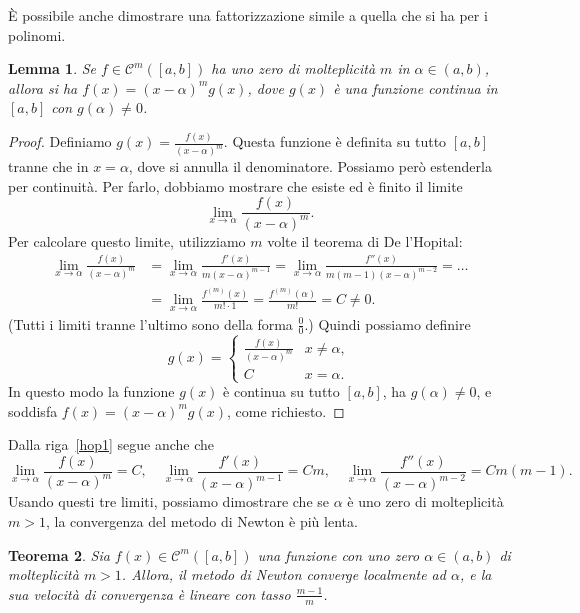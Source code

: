 \documentclass[a4paper]{report}
\newtheorem{theorem}{Teorema}[chapter]
\newtheorem{lemma}[theorem]{Lemma}
\theoremstyle{definiton}
\theoremstyle{remark}
\begin{document}
È possibile anche dimostrare una fattorizzazione simile a quella che si ha per i polinomi.
\begin{lemma}
Se $f\in\mathcal{C}^m([a,b])$ ha uno zero di molteplicità $m$ in $\alpha \in (a,b)$, allora si ha $f(x) = (x-\alpha)^m g(x)$, dove $g(x)$ è una funzione continua in $[a,b]$ con $g(\alpha) \neq 0$.
\end{lemma}
\begin{proof}
Definiamo $g(x) = \frac{f(x)}{(x-\alpha)^m}$. Questa funzione è definita su tutto $[a,b]$ tranne che in $x=\alpha$, dove si annulla il denominatore. Possiamo però estenderla per continuità. Per farlo, dobbiamo mostrare che esiste ed è finito il limite
\[
\lim_{x\to \alpha} \frac{f(x)}{(x-\alpha)^m}.
\]
Per calcolare questo limite, utilizziamo $m$ volte il teorema di De l'Hopital: 
\begin{align} \label{hop1}
\lim_{x\to \alpha} \frac{f(x)}{(x-\alpha)^m} &= \lim_{x\to \alpha} \frac{f'(x)}{m(x-\alpha)^{m-1}} = \lim_{x\to \alpha} \frac{f''(x)}{m(m-1)(x-\alpha)^{m-2}} = \dots \\
&= \lim_{x\to \alpha} \frac{f^{(m)}(x)}{m!\cdot 1} = \frac{f^{(m)}(\alpha)}{m!} = C\neq 0.
\end{align}
(Tutti i limiti tranne l'ultimo sono della forma $\frac{0}{0}$.)
Quindi possiamo definire
\[
    g(x) = \begin{cases}
        \frac{f(x)}{(x-\alpha)^m} & x\neq \alpha,\\
        C & x=\alpha.
    \end{cases}
\]
In questo modo la funzione $g(x)$ è continua su tutto $[a,b]$, ha $g(\alpha)\neq 0$, e soddisfa $f(x) = (x-\alpha)^m g(x)$, come richiesto.
\end{proof}
Dalla riga~\eqref{hop1} segue anche che
\begin{equation} \label{limnotevoli}
\lim_{x\to\alpha} \frac{f(x)}{(x-\alpha)^{m}} = C, \quad \lim_{x\to\alpha} \frac{f'(x)}{(x-\alpha)^{m-1}} = Cm, \quad \lim_{x\to\alpha} \frac{f''(x)}{(x-\alpha)^{m-2}} = Cm(m-1).    
\end{equation}
Usando questi tre limiti, possiamo dimostrare che se $\alpha$ è uno zero di molteplicità $m>1$, la convergenza del metodo di Newton è più lenta.
\begin{theorem}
    Sia $f(x) \in \mathcal{C}^m([a,b])$ una funzione con uno zero $\alpha \in (a,b)$ di molteplicità $m>1$.
    Allora, il metodo di Newton converge localmente ad $\alpha$, e la sua velocità di convergenza è lineare con tasso $\frac{m-1}{m}$.
\end{theorem}
\end{document}
